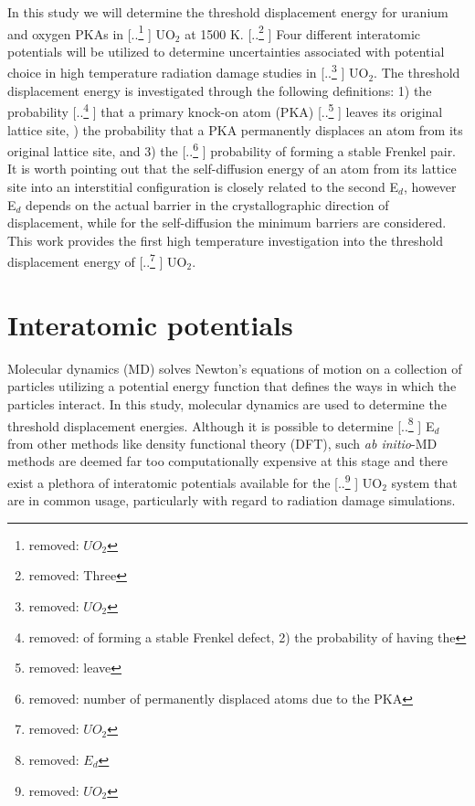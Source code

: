 \documentclass[review]{elsarticle} %
\providecommand{\DIFaddtex}[1]{{\protect\color{blue} \sf #1}} %
\providecommand{\DIFdeltex}[1]{{\protect\color{red} [..\footnote{removed: #1} ]}} %
\providecommand{\DIFaddbegin}{} %
\providecommand{\DIFaddend}{} %
\providecommand{\DIFdelbegin}{} %
\providecommand{\DIFdelend}{} %
\providecommand{\DIFadd}[1]{\texorpdfstring{\DIFaddtex{#1}}{#1}} %
\providecommand{\DIFdel}[1]{\texorpdfstring{\DIFdeltex{#1}}{}} %
\newcommand{\DIFscaledelfig}{0.5}
\newlength{\DIFdelgraphicswidth} %
\newlength{\DIFdelgraphicsheight} %
\newcommand{\DIFaddincludegraphics}[2][]{{\color{blue}\fbox{\DIFOincludegraphics[#1]{#2}}}} %
\newcommand{\DIFdelincludegraphics}[2][]{%
\sbox{\DIFdelgraphicsbox}{\DIFOincludegraphics[#1]{#2}}%
\settoboxwidth{\DIFdelgraphicswidth}{\DIFdelgraphicsbox} %
\settoboxtotalheight{\DIFdelgraphicsheight}{\DIFdelgraphicsbox} %
\scalebox{\DIFscaledelfig}{%
\parbox[b]{\DIFdelgraphicswidth}{\usebox{\DIFdelgraphicsbox}\\[-\baselineskip] \rule{\DIFdelgraphicswidth}{0em}}\llap{\resizebox{\DIFdelgraphicswidth}{\DIFdelgraphicsheight}{%
\setlength{\unitlength}{\DIFdelgraphicswidth}%
\begin{picture}(1,1)%
\thicklines\linethickness{2pt} %
{\color[rgb]{1,0,0}\put(0,0){\framebox(1,1){}}}%
{\color[rgb]{1,0,0}\put(0,0){\line( 1,1){1}}}%
{\color[rgb]{1,0,0}\put(0,1){\line(1,-1){1}}}%
\end{picture}%
}\hspace*{3pt}}} %
} %
\DeclareRobustCommand{\DIFaddbegin}{\DIFOaddbegin \let\includegraphics\DIFaddincludegraphics} %
\DeclareRobustCommand{\DIFaddend}{\DIFOaddend \let\includegraphics\DIFOincludegraphics} %
\DeclareRobustCommand{\DIFdelbegin}{\DIFOdelbegin \let\includegraphics\DIFdelincludegraphics} %
\DeclareRobustCommand{\DIFdelend}{\DIFOaddend \let\includegraphics\DIFOincludegraphics} %
\begin{document}
In this study we will determine the threshold displacement energy for uranium and oxygen PKAs in \DIFdelbegin \DIFdel{$UO_2$ }\DIFdelend \DIFaddbegin \DIFadd{UO$_2$ }\DIFaddend at 1500 K. \DIFdelbegin \DIFdel{Three }\DIFdelend \DIFaddbegin \DIFadd{Four }\DIFaddend different interatomic potentials will be utilized to determine uncertainties associated with potential choice in high temperature radiation damage studies in \DIFdelbegin \DIFdel{$UO_2$}\DIFdelend \DIFaddbegin \DIFadd{UO$_2$}\DIFaddend . The threshold displacement energy is investigated through the following definitions: 1) the probability \DIFdelbegin \DIFdel{of forming a stable Frenkel defect, 2) the probability of having the }\DIFdelend \DIFaddbegin \DIFadd{that a }\DIFaddend primary knock-on atom (PKA) \DIFdelbegin \DIFdel{leave }\DIFdelend \DIFaddbegin \DIFadd{leaves }\DIFaddend its original lattice site, \DIFaddbegin \DIFadd{2) the probability that a PKA permanently displaces an atom from its original lattice site, }\DIFaddend and 3) the \DIFdelbegin \DIFdel{number of permanently displaced atoms due to the PKA}\DIFdelend \DIFaddbegin \DIFadd{probability of forming a stable Frenkel pair. It is worth pointing out that the self-diffusion energy of an atom from its lattice site into an interstitial configuration is closely related to the second E$_d$, however E$_d$ depends on the actual barrier in the crystallographic direction of displacement, while for the self-diffusion the minimum barriers are considered}\DIFaddend . This work provides the first high temperature investigation into the threshold displacement energy of \DIFdelbegin \DIFdel{$UO_2$}\DIFdelend \DIFaddbegin \DIFadd{UO$_2$}\DIFaddend .

\section{Interatomic potentials}

\hspace{5mm}
Molecular dynamics (MD) solves Newton's equations of motion on a collection of particles utilizing a potential energy function that defines the ways in which the particles interact. In this study, molecular dynamics are used to determine the threshold displacement energies. Although it is possible to determine \DIFdelbegin \DIFdel{$E_d$ }\DIFdelend \DIFaddbegin \DIFadd{E$_d$ }\DIFaddend from other methods like density functional theory (DFT), such \textit{ab initio}-MD methods are deemed far too computationally expensive at this stage and there exist a plethora of interatomic potentials available for the \DIFdelbegin \DIFdel{$UO_2$ }\DIFdelend \DIFaddbegin \DIFadd{UO$_2$ }\DIFaddend system that are in common usage, particularly with regard to radiation damage simulations.
\end{document}
